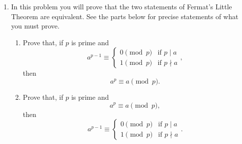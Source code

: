\documentclass[12pt]{article}
\begin{document}
\begin{enumerate}
\item In this problem you will prove that the two statements of Fermat's Little Theorem are equivalent. See the parts below for precise statements of what you must prove. 
\begin{enumerate}
\item Prove that,  if \(p\) is prime and $$a^{p-1}\equiv \begin{cases} 0 \pmod{p} & \text{if } p\mid a \\ 1 \pmod{p} & \text{if } p\nmid a \end{cases},$$ then $$a^p\equiv a\pmod{p}.$$
\item Prove that, if \(p\) is prime and $$a^p\equiv a\pmod{p},$$ then $$a^{p-1}\equiv \begin{cases} 0 \pmod{p} & \text{if } p\mid a \\ 1 \pmod{p} & \text{if } p\nmid a \end{cases}.$$
\end{enumerate}

\end{enumerate}
\end{document}
